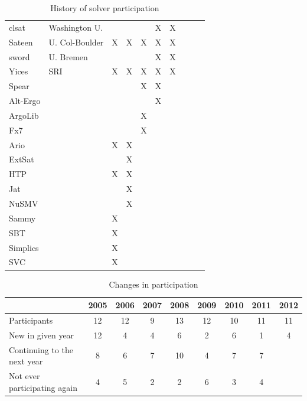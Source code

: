 \documentclass{llncs}
\begin{document}
\begin{table}[t]
\begin{tabular}{|l|l|c|c|c|c|c|c|c|c|}
clsat                  & Washington U.  &   &   &   & X & X &   &   &   \\		
Sateen                 & U. Col-Boulder & X & X & X & X & X &   &   &   \\		
sword                  & U. Bremen      &   &   &   & X & X &   &   &   \\		
Yices                  & SRI            & X & X & X & X & X &   &   &   \\		
Spear                  &   &   &   & X & X &   &   &   &   \\		
Alt-Ergo               &   &   &   &   & X &   &   &   &   \\			
ArgoLib                &   &   &   & X &   &   &   &   &   \\				
Fx7                    &   &   &   & X &   &   &   &   &   \\				
Ario                   &   & X & X &   &   &   &   &   &   \\					
ExtSat                 &   &   & X &   &   &   &   &   &   \\					
HTP                    &   & X & X &   &   &   &   &   &   \\					
Jat                    &   &   & X &   &   &   &   &   &   \\					
NuSMV                  &   &   & X &   &   &   &   &   &   \\					
Sammy                  &   & X &   &   &   &   &   &   &   \\						
SBT                    &   & X &   &   &   &   &   &   &   \\						
Simplics               &   & X &   &   &   &   &   &   &   \\					
SVC	                   &   & X &   &   &   &   &   &   &   \\	
\hline					
\end{tabular}
\vspace{.2in}
\caption{History of solver participation}
\label{Table:participants}
\end{table}

\begin{table}
\centering
\begin{tabular}{|l|c|c|c|c|c|c|c|c|}
\hline
 & 2005 & 2006 & 2007 & 2008 & 2009 & 2010 & 2011 & 2012 \\
\hline
Participants                 & 12 & 12 & 9 & 13 & 12 & 10 & 11 & 11 \\
New in given year            & 12 &  4 & 4 &  6 &  2 &  6 &  1 &  4 \\
Continuing to the next year  &  8 &  6 & 7 & 10 &  4 &  7 &  7 &    \\
Not ever participating again &  4 &  5 & 2 &  2 &  6 &  3 &  4 &    \\ 
\hline
\end{tabular}
\vspace{.2in}
\caption{Changes in participation}
\label{Table:changes}
\end{table}
\end{document}
